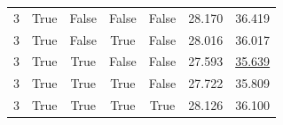 \begin{table}[ht]
\begin{tabular*}{\linewidth}{@{\extracolsep{\fill}}ccccccc@{}}
        3                          & True                       & False                & False & False & 28.170          & 36.419          \\
        3                          & True                       & False                & True  & False & 28.016          & 36.017          \\
        3                          & True                       & True                 & False & False & 27.593          & \underline{35.639} \\
        3                          & True                       & True                 & True  & False & 27.722          & 35.809          \\
        3                          & True                       & True                 & True  & True  & 28.126          & 36.100          \\
        \bottomrule
    \end{tabular*}
\end{table}

